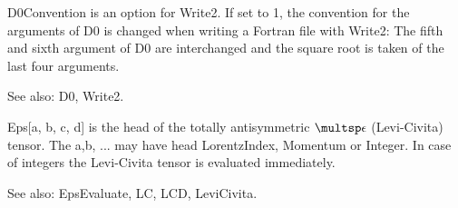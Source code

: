 




D0Convention is an option for Write2. If set to 1, the convention for the arguments of D0 is changed when writing a Fortran file with
  Write2: The fifth and sixth argument of D0 are interchanged and the square root is taken of the last four arguments.

See also: D0, Write2.



Eps[a, b, c, d] is the head of the totally antisymmetric \(\multsp \epsilon \) (Levi-Civita) tensor. The a,b, ... may have head LorentzIndex, Momentum
or Integer. In case of integers the Levi-Civita tensor is
  evaluated immediately.



See also:  EpsEvaluate, LC, LCD, LeviCivita.



\dispSFoutmath{
{{\epsilon }^{\mu \nu \rho \sigma }}
}





